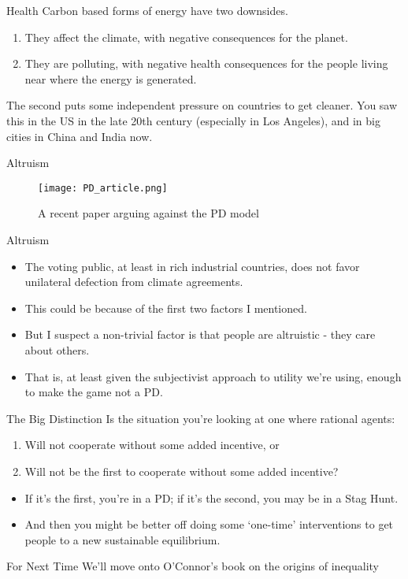 \documentclass[
  ignorenonframetext,
]{beamer}
\providecommand{\tightlist}{%
  \setlength{\itemsep}{0pt}\setlength{\parskip}{0pt}}
\begin{document}
\begin{frame}{Health}
\protect\hypertarget{health}{}
Carbon based forms of energy have two downsides.

\begin{enumerate}
\tightlist
\item
  They affect the climate, with negative consequences for the planet.
\item
  They are polluting, with negative health consequences for the people
  living near where the energy is generated.
\end{enumerate}

The second puts some independent pressure on countries to get cleaner.
You saw this in the US in the late 20th century (especially in Los
Angeles), and in big cities in China and India now.
\end{frame}

\begin{frame}{Altruism}
\protect\hypertarget{altruism}{}
\begin{figure}
\centering
\texttt{[image: PD\_article.png]}
\caption{A recent paper arguing against the PD model}
\end{figure}
\end{frame}

\begin{frame}{Altruism}
\protect\hypertarget{altruism-1}{}
\begin{itemize}
\tightlist
\item
  The voting public, at least in rich industrial countries, does not
  favor unilateral defection from climate agreements.
\item
  This could be because of the first two factors I mentioned.
\item
  But I suspect a non-trivial factor is that people are altruistic -
  they care about others.
\item
  That is, at least given the subjectivist approach to utility we're
  using, enough to make the game not a PD.
\end{itemize}
\end{frame}

\begin{frame}{The Big Distinction}
\protect\hypertarget{the-big-distinction}{}
Is the situation you're looking at one where rational agents:

\begin{enumerate}
\tightlist
\item
  Will not cooperate without some added incentive, or
\item
  Will not be the first to cooperate without some added incentive?
\end{enumerate}

\begin{itemize}
\tightlist
\item
  If it's the first, you're in a PD; if it's the second, you may be in a
  Stag Hunt.
\item
  And then you might be better off doing some `one-time' interventions
  to get people to a new sustainable equilibrium.
\end{itemize}
\end{frame}

\begin{frame}{For Next Time}
\protect\hypertarget{for-next-time}{}
We'll move onto O'Connor's book on the origins of inequality
\end{frame}
\end{document}
